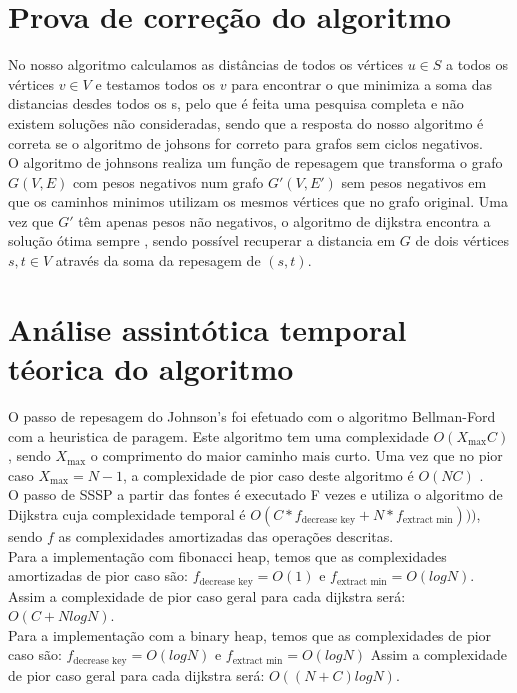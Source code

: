 \documentclass{scrartcl}
\begin{document}
\section*{Prova de correção do algoritmo}
No nosso algoritmo calculamos as distâncias de todos os vértices $u \in S$ a todos os vértices $v \in V$ e testamos todos os $v$ para encontrar o que minimiza a soma das distancias desdes todos os s, pelo que é feita uma pesquisa completa e não existem soluções não consideradas, sendo que a resposta do nosso algoritmo é correta se o algoritmo de johsons for correto para grafos sem ciclos negativos. \\
O algoritmo de johnsons realiza um função de repesagem que transforma o grafo $G(V,E)$ com pesos negativos num grafo $G'(V,E')$ sem pesos negativos em que os caminhos minimos utilizam os mesmos vértices que no grafo original\cite{johnson}. Uma vez que $G'$ têm apenas pesos não negativos, o algoritmo de dijkstra encontra a solução ótima sempre \cite{dijkstra}, sendo possível recuperar a distancia em $G$ de dois vértices $s, t \in V$  através da soma da repesagem de $(s,t)$.

\section*{Análise assintótica temporal téorica do algoritmo}
O passo de repesagem do Johnson's foi efetuado com o algoritmo Bellman-Ford com a heuristica de paragem. Este algoritmo tem uma complexidade $O(X_{\text{max}}C)$, sendo $X_{\text{max}}$ o comprimento do maior caminho mais curto. Uma vez que no pior caso $X_{\text{max}} = N-1$, a complexidade de pior caso deste algoritmo é $O(NC)$ \cite{bf}.\\

O passo de SSSP a partir das fontes é executado F vezes e utiliza o algoritmo de Dijkstra cuja complexidade temporal é $O(C*f_{\text{decrease key}} + N*f_{\text{extract min}})))$, sendo $f$ as complexidades amortizadas das operações descritas.\cite{dijkstra}\\

Para a implementação com fibonacci heap, temos que as complexidades amortizadas de pior caso são:
$f_{\text{decrease key}} = O(1)$ e $f_{\text{extract min}}=O(log N)$. Assim a complexidade de pior caso geral para cada dijkstra será: $O(C + NlogN)$. \\

Para a implementação com a binary heap, temos que as complexidades de pior caso são:
$f_{\text{decrease key}} = O(log N)$ e $f_{\text{extract min}}=O(log N)$
Assim a complexidade de pior caso geral para cada dijkstra será: $O((N+C)logN)$. \\
\end{document}
